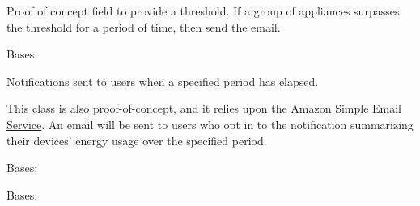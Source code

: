 \documentclass[letterpaper,10pt,english]{sphinxmanual}
\begin{document}
\begin{fulllineitems}

\begin{fulllineitems}
\label{modules/webapp:webapp.models.EventNotification.watts_above_average}
Proof of concept field to provide a threshold. If a group of appliances surpasses the threshold for a period of time, then send the email.

\end{fulllineitems}


\end{fulllineitems}


\begin{fulllineitems}
\label{modules/webapp:webapp.models.IntervalNotification}
Bases: 

Notifications sent to users when a specified period has elapsed.

This class is also proof-of-concept, and it relies upon the \href{http://aws.amazon.com/ses/}{Amazon Simple Email Service}.
An email will be sent to users who opt in to the notification summarizing their devices' energy usage over the specified
period.

\begin{fulllineitems}
\label{modules/webapp:webapp.models.IntervalNotification.DoesNotExist}
Bases: 

\end{fulllineitems}


\begin{fulllineitems}
\label{modules/webapp:webapp.models.IntervalNotification.MultipleObjectsReturned}
Bases: 

\end{fulllineitems}



\end{fulllineitems}
\end{document}

